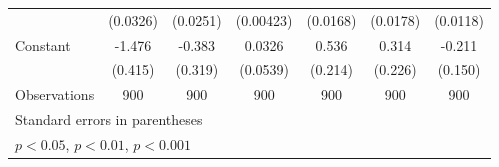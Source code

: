 {\begin{tabular}{l*{6}{c}}
                    &    (0.0326)         &    (0.0251)         &   (0.00423)         &    (0.0168)         &    (0.0178)         &    (0.0118)         \\
[1em]
Constant            &      -1.476\sym{***}&      -0.383         &      0.0326         &       0.536\sym{*}  &       0.314         &      -0.211         \\
                    &     (0.415)         &     (0.319)         &    (0.0539)         &     (0.214)         &     (0.226)         &     (0.150)         \\
\hline
Observations        &         900         &         900         &         900         &         900         &         900         &         900         \\
\hline\hline
\multicolumn{7}{l}{\footnotesize Standard errors in parentheses}\\
\multicolumn{7}{l}{\footnotesize \sym{*} \(p<0.05\), \sym{**} \(p<0.01\), \sym{***} \(p<0.001\)}\\
\end{tabular}
}